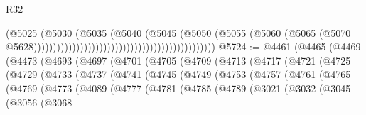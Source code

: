 \begin{lexlean}{R32}
\begin{coremodule}
                                                                              (@5025
                                                                                (@5030
                                                                                  (@5035
                                                                                    (@5040
                                                                                      (@5045
                                                                                        (@5050
                                                                                          (@5055
                                                                                            (@5060
                                                                                              (@5065
                                                                                                (@5070
                                                                                                  @5628)))))))))))))))))))))))))))))))))))))))))))))))
@5724 := @4461
    (@4465
      (@4469
        (@4473
          (@4693
            (@4697
              (@4701
                (@4705
                  (@4709
                    (@4713
                      (@4717
                        (@4721
                          (@4725
                            (@4729
                              (@4733
                                (@4737
                                  (@4741
                                    (@4745
                                      (@4749
                                        (@4753
                                          (@4757
                                            (@4761
                                              (@4765
                                                (@4769
                                                  (@4773
                                                    (@4089
                                                      (@4777
                                                        (@4781
                                                          (@4785
                                                            (@4789
                                                              (@3021
                                                                (@3032
                                                                  (@3045
                                                                    (@3056
                                                                      (@3068

\end{coremodule}
\end{lexlean}
